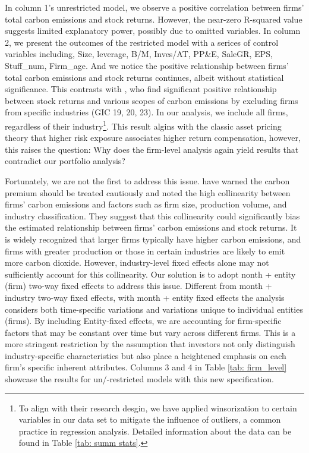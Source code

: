 \documentclass[12pt]{article}
\begin{document}
In column 1's unrestricted model, we observe a positive correlation between firms' total carbon emissions and stock returns. However, the near-zero R-squared value suggests limited explanatory power, possibly due to omitted variables. In column 2, we present the outcomes of the restricted model with a serices of control variables including, Size, leverage, B/M, Inves/AT, PP\&E, SaleGR, EPS, Stuff\_num, Firm\_age. And we notice the positive relationship between firms' total carbon emissions and stock returns continues, albeit without statistical significance. This contrasts with \citet{bolton2021investors}, who find significant positive relationship between stock returns and various scopes of carbon emissions by excluding firms from specific industries (GIC 19, 20, 23). In our analysis, we include all firms, regardless of their industry\footnote{To align with their research desgin, we have applied winsorization to certain variables in our data set to mitigate the influence of outliers, a common practice in regression analysis. Detailed information about the data can be found in Table \ref{tab: summ stats}.}. This result algins with the classic asset pricing theory that higher risk exposure associates higher return compensation, however, this raises the question: Why does the firm-level analysis again yield results that contradict our portfolio analysis?

Fortunately, we are not the first to address this issue. \citet{aswani2023carbon} have warned the carbon premium should be treated cautiously and noted the high collinearity between firms' carbon emissions and factors such as firm size, production volume, and industry classification. They suggest that this collinearity could significantly bias the estimated relationship between firms' carbon emissions and stock returns. It is widely recognized that larger firms typically have higher carbon emissions, and firms with greater production or those in certain industries are likely to emit more carbon dioxide. However, industry-level fixed effects alone may not sufficiently account for this collinearity. Our solution is to adopt nonth + entity (firm) two-way fixed effects to address this issue. Different from month + industry two-way fixed effects, with month + entity fixed effects the analysis considers both time-specific variations and variations unique to individual entities (firms). By including Entity-fixed effects, we are accounting for firm-specific factors that may be constant over time but vary across different firms. This is a more stringent restriction by the assumption that investors not only distinguish industry-specific characteristics but also place a heightened emphasis on each firm's specific inherent attributes. Columns 3 and 4 in Table \ref{tab: firm_level} showcase the results for un/-restricted models with this new specification.
\end{document}
